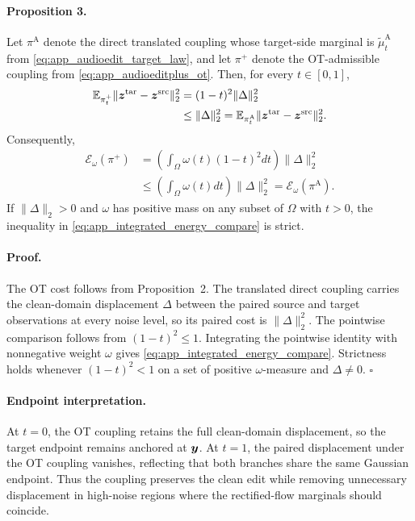 \paragraph{Proposition 3.}
Let $\pi^{\mathrm{A}}$ denote the direct translated coupling whose target-side marginal is $\widetilde{\mu}^{\mathrm{A}}_t$ from \eqref{eq:app_audioedit_target_law}, and let $\pi^+$ denote the OT-admissible coupling from \eqref{eq:app_audioeditplus_ot}.
Then, for every $t\in[0,1]$,
\begin{equation}
    \label{eq:app_pointwise_energy_compare}
    \begin{aligned}
    \mathbb{E}_{\pi_t^+}
    \|\boldsymbol{z}^{\mathrm{tar}}-\boldsymbol{z}^{\mathrm{src}}\|_2^2
    &=
    (1-t)^2\|\Delta\|_2^2
    \\
    &\le
    \|\Delta\|_2^2
    =
    \mathbb{E}_{\pi_t^{\mathrm{A}}}
    \|\boldsymbol{z}^{\mathrm{tar}}-\boldsymbol{z}^{\mathrm{src}}\|_2^2.
    \end{aligned}
\end{equation}
Consequently,
\begin{equation}
    \label{eq:app_integrated_energy_compare}
    \begin{aligned}
    \mathcal{E}_{\omega}(\pi^+)
    &=
    \left(\int_{\Omega}\omega(t)(1-t)^2dt\right)
    \|\Delta\|_2^2
    \\
    &\le
    \left(\int_{\Omega}\omega(t)dt\right)
    \|\Delta\|_2^2
    =
    \mathcal{E}_{\omega}(\pi^{\mathrm{A}}).
    \end{aligned}
\end{equation}
If $\|\Delta\|_2>0$ and $\omega$ has positive mass on any subset of $\Omega$ with $t>0$, the inequality in \eqref{eq:app_integrated_energy_compare} is strict.

\paragraph{Proof.}
The OT cost follows from Proposition~2.
The translated direct coupling carries the clean-domain displacement $\Delta$ between the paired source and target observations at every noise level, so its paired cost is $\|\Delta\|_2^2$.
The pointwise comparison follows from $(1-t)^2\le 1$.
Integrating the pointwise identity with nonnegative weight $\omega$ gives \eqref{eq:app_integrated_energy_compare}.
Strictness holds whenever $(1-t)^2<1$ on a set of positive $\omega$-measure and $\Delta\ne 0$.
\hfill$\square$

\paragraph{Endpoint interpretation.}
At $t=0$, the OT coupling retains the full clean-domain displacement, so the target endpoint remains anchored at $\boldsymbol{y}$.
At $t=1$, the paired displacement under the OT coupling vanishes, reflecting that both branches share the same Gaussian endpoint.
Thus the coupling preserves the clean edit while removing unnecessary displacement in high-noise regions where the rectified-flow marginals should coincide.

